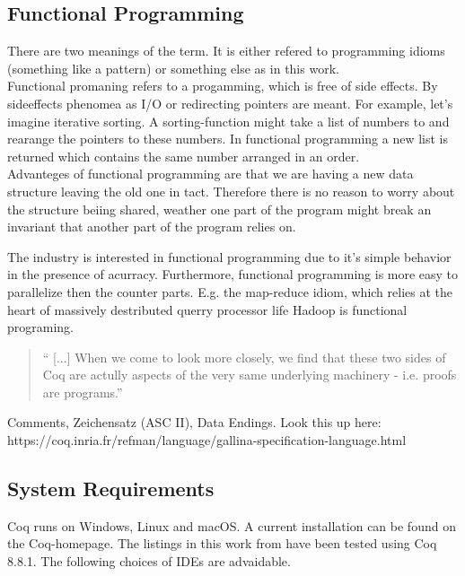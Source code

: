 \subsection{Functional Programming}
There are two meanings of the term. 
It is either refered to programming idioms (something like a pattern) or something else as in this work.\\

Functional promaning refers to a progamming, which is free of side effects.
By sideeffects phenomea as I/O or redirecting pointers are meant. 
For example, let's imagine iterative sorting. 
A sorting-function might take a list of numbers to and rearange the pointers to these numbers.
In functional programming a new list is returned which contains the same number arranged in an order.\\ 
Advanteges of functional programming are  that we are having a new data structure leaving the old one in tact. 
Therefore there is no reason to worry about the structure beiing shared, weather one part of the program might break an invariant that another part of the program relies on.\par
The industry is interested in functional programming due to it's simple behavior in the presence of acurracy.
Furthermore, functional programming is more easy to parallelize then the counter parts.
E.g. the map-reduce idiom, which relies at the heart of massively destributed querry processor life \gls{Hadoop} is functional programing. 

\begin{quote}
`` [...] When we come to look more closely, we find that these two sides of Coq are actully aspects of the very same underlying machinery - i.e. proofs are programs.'' 
\end{quote}



Comments, Zeichensatz (ASC II), Data Endings.
Look this up here:\\
https://coq.inria.fr/refman/language/gallina-specification-language.html




\subsection{System Requirements}

Coq runs on Windows, Linux and macOS.
A current installation can be found on the Coq-homepage. 
The listings in this work from \cite{PACGGHSY} have been tested using Coq 8.8.1.
The following choices of IDEs are advaidable. 

